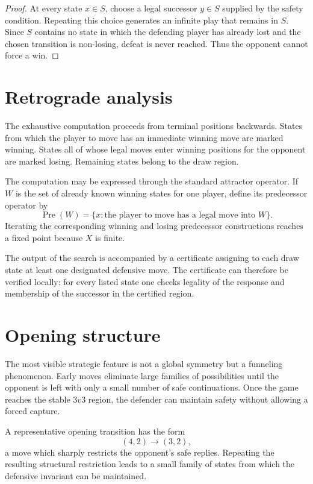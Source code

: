\documentclass[11pt,a4paper]{article}
\theoremstyle{plain}
\theoremstyle{definition}
\begin{document}
\begin{proof}
At every state $x\in S$, choose a legal successor $y\in S$ supplied by the safety condition. Repeating this choice generates an infinite play that remains in $S$. Since $S$ contains no state in which the defending player has already lost and the chosen transition is non-losing, defeat is never reached. Thus the opponent cannot force a win.
\end{proof}

\section{Retrograde analysis}

The exhaustive computation proceeds from terminal positions backwards. States from which the player to move has an immediate winning move are marked winning. States all of whose legal moves enter winning positions for the opponent are marked losing. Remaining states belong to the draw region.

The computation may be expressed through the standard attractor operator. If $W$ is the set of already known winning states for one player, define its predecessor operator by
\[
\operatorname{Pre}(W)=\{x: \text{the player to move has a legal move into }W\}.
\]
Iterating the corresponding winning and losing predecessor constructions reaches a fixed point because $X$ is finite.

The output of the search is accompanied by a certificate assigning to each draw state at least one designated defensive move. The certificate can therefore be verified locally: for every listed state one checks legality of the response and membership of the successor in the certified region.

\section{Opening structure}

The most visible strategic feature is not a global symmetry but a funneling phenomenon. Early moves eliminate large families of possibilities until the opponent is left with only a small number of safe continuations. Once the game reaches the stable $3v3$ region, the defender can maintain safety without allowing a forced capture.

A representative opening transition has the form
\[
(4,2)\longrightarrow(3,2),
\]
a move which sharply restricts the opponent's safe replies. Repeating the resulting structural restriction leads to a small family of states from which the defensive invariant can be maintained.
\end{document}
